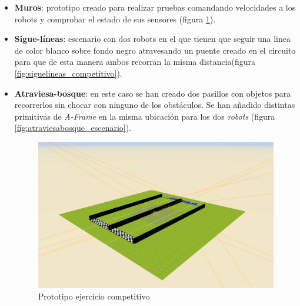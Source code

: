 \begin{itemize}
    \item \textbf{Muros}: prototipo creado para realizar pruebas comandando velocidades a los robots y comprobar el estado de sus sensores (figura \ref{fig:ejercicio_muro}).
    
    \item \textbf{Sigue-líneas}: escenario con dos robots en el que tienen que seguir una linea de color blanco sobre fondo negro atravesando un puente creado en el circuito para que de esta manera ambos recorran la misma distancia(figura \ref{fig:siguelineas_competitivo}). 
    
    \item \textbf{Atraviesa-bosque}: en este caso se han creado dos pasillos con objetos para recorrerlos sin chocar con ninguno de los obstáculos. Se han añadido distintas primitivas de \textit{A-Frame} en la misma ubicación para los dos \textit{robots} (figura \ref{fig:atraviesabosque_escenario}). 
    
       \begin{figure}[H]
        \centering           
        \includegraphics[scale=0.3]{img/ejercicio_muros.png}
        \caption{Prototipo ejercicio competitivo}
        \label{fig:ejercicio_muro}
    \end{figure}
    

\end{itemize}
